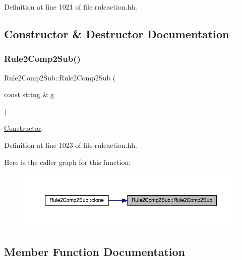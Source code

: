 Definition at line 1021 of file ruleaction.\+hh.



\subsection{Constructor \& Destructor Documentation}
\mbox{\label{class_rule2_comp2_sub_ae7a733910497e960661ac751b2ad93d6}} 
\subsubsection{\texorpdfstring{Rule2Comp2Sub()}{Rule2Comp2Sub()}}
{\footnotesize\ttfamily Rule2\+Comp2\+Sub\+::\+Rule2\+Comp2\+Sub (\begin{DoxyParamCaption}\item[{const string \&}]{g }\end{DoxyParamCaption})\hspace{0.3cm}{\ttfamily [inline]}}



\mbox{\hyperlink{class_constructor}{Constructor}}. 



Definition at line 1023 of file ruleaction.\+hh.

Here is the caller graph for this function\+:
\nopagebreak
\begin{figure}[H]
\begin{center}
\leavevmode
\includegraphics[width=350pt]{class_rule2_comp2_sub_ae7a733910497e960661ac751b2ad93d6_icgraph}
\end{center}
\end{figure}


\subsection{Member Function Documentation}
\mbox{\label{class_rule2_comp2_sub_a016089f19466049e949fd664649c27e4}} 
